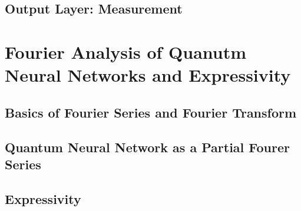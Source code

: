 \documentclass[12pt]{article}
\numberwithin{equation}{section}  %
\theoremstyle{definition}
\theoremstyle{plain}
\theoremstyle{remark}
\begin{document}
\subsection{Output Layer: Measurement}


\section{Fourier Analysis of Quanutm Neural Networks and Expressivity}

\subsection{Basics of Fourier Series and Fourier Transform}

\subsection{Quantum Neural Network as a Partial Fourer Series}

\subsection{Expressivity}
\end{document}
